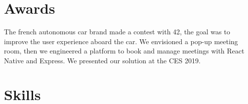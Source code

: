 \documentclass[a4paper]{deedy-resume} %
\begin{document}
\section{Awards}

\insectionspace

\sectionspace %


\begin{description}[leftmargin=*]
\item The french autonomous car brand made a contest with 42, the goal was to improve the user experience aboard the car. We envisioned a pop-up meeting room, then we engineered a platform to book and manage meetings with React Native and Express. We presented our solution at the CES 2019.
\end{description}



\section{Skills}
\end{document}
